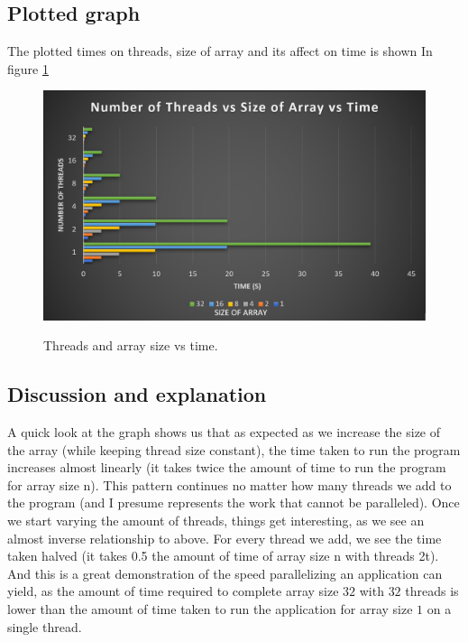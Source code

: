 \subsection{Plotted graph}

The plotted times on threads, size of array and its affect on time is shown In
figure \ref{fig:threasizetime}

\begin{figure}
    \centering
    \includegraphics[width=\linewidth]{Figures/graph.png}
    \label{fig:threasizetime}
    \caption{Threads and array size vs time.}
\end{figure}

\subsection{Discussion and explanation} 
A quick look at the graph shows us that as expected as we increase the size 
of the array (while keeping thread size constant), the time taken to run the 
program increases almost linearly (it takes twice the amount of time to run the 
program for array size n). This pattern continues no matter how many threads 
we add to the program (and I presume represents the work that cannot be 
paralleled). Once we start varying the amount of threads, things get 
interesting, as we see an almost inverse relationship to above. For every thread
we add, we see the time taken halved (it takes 0.5 the amount of time of array 
size n with threads 2t). And this is a great demonstration of the speed 
parallelizing an application can yield, as the amount of time required to 
complete array size $32$ with $32$ threads is lower than the amount of time taken
to run the application for array size $1$ on a single thread.
